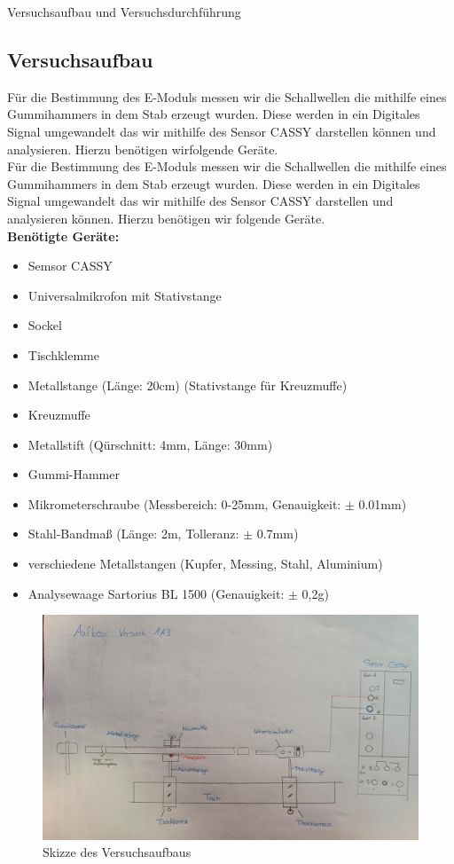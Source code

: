 \documentclass[twoside]{protokoll}
\begin{document}
\begin{aufgabe}{Versuchsaufbau und Versuchsdurchführung}
\subsection{Versuchsaufbau}
  Für die Bestimmung des E-Moduls messen wir die Schallwellen die mithilfe eines Gummihammers in dem Stab erzeugt wurden.
    Diese werden in ein Digitales Signal umgewandelt das wir mithilfe des Sensor CASSY darstellen können und analysieren.
    Hierzu benötigen wirfolgende Geräte.\\

    Für die Bestimmung des E-Moduls messen wir die Schallwellen die mithilfe eines Gummihammers in dem Stab erzeugt wurden.
    Diese werden in ein Digitales Signal umgewandelt das wir mithilfe des Sensor CASSY darstellen und analysieren können.
    Hierzu benötigen wir folgende Geräte.\\

\textbf{Benötigte Geräte:}
\begin{itemize}
\item Semsor CASSY
\item Universalmikrofon mit Stativstange
\item Sockel
\item Tischklemme
\item Metallstange (Länge: 20cm) (Stativstange für Kreuzmuffe)
\item Kreuzmuffe
\item Metallstift (Qürschnitt: 4mm, Länge: 30mm)
\item Gummi-Hammer
\item Mikrometerschraube (Messbereich: 0-25mm, Genauigkeit: $\pm$ 0.01mm)
\item Stahl-Bandmaß (Länge: 2m, Tolleranz: $\pm$ 0.7mm)
\item verschiedene Metallstangen (Kupfer, Messing, Stahl, Aluminium)
\item Analysewaage Sartorius BL 1500 (Genauigkeit: $\pm$ 0,2g)
\end{itemize}


\begin{figure}[H]
  \centering
  \includegraphics[width=1\textwidth]{Bilder/434170_428396_1A3_SkizzeAufbau.pdf}
  \caption{Skizze des Versuchsaufbaus}
  \centering
\end{figure}
 

\end{aufgabe}
\end{document}
